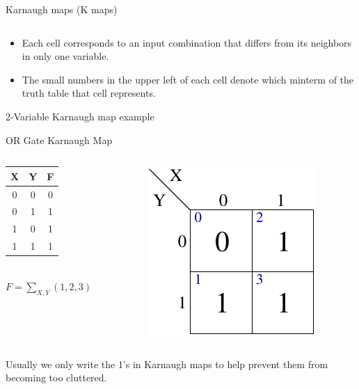 \begin{frame}{Karnaugh maps (K maps)}
\begin{center}
\begin{tabular}{ccc}
    \end{tabular}
  \end{center}
  \begin{itemize}
    \item Each cell corresponds to an input combination that differs from its neighbors in only one variable.
    \item The small numbers in the upper left of each cell denote which minterm of the truth table that cell represents.
  \end{itemize}
\end{frame}

\begin{frame}{2-Variable Karnaugh map example}
  \begin{block}{OR Gate Karnaugh Map}
    \begin{columns}
      \begin{column}{5cm}
        \begin{center}
          \begin{tabular}{cc|c}
            \textbf{X} & \textbf{Y} & \textbf{F} \\
            \hline
            0 & 0 & 0 \\
            0 & 1 & 1 \\
            1 & 0 & 1 \\
            1 & 1 & 1 \\
          \end{tabular}\\
          \bigskip
          $F = \sum_{X,Y}(1,2,3)$
        \end{center}
      \end{column}
      \begin{column}{5cm}
        \begin{center}
          \includegraphics{2VariableORKMap}
        \end{center}
      \end{column}
    \end{columns}
  \end{block}
  Usually we only write the 1's in Karnaugh maps to help prevent them from becoming too cluttered.
\end{frame}

